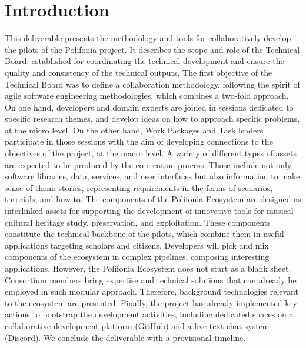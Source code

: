 \chapter{Introduction}
This deliverable presents the methodology and tools for collaboratively develop the pilots of the Polifonia project. It describes the scope and role of the Technical Board, established for coordinating the technical development and ensure the quality and consistency of the technical outputs. The first objective of the Technical Board was to define a collaboration methodology, following the spirit of agile software engineering methodologies, which combines a two-fold approach. On one hand, developers and domain experts are joined in sessions dedicated to specific research themes, and develop ideas on how to approach specific problems, at the micro level. On the other hand, Work Packages and Task leaders participate in those sessions with the aim of developing connections to the objectives of the project, at the macro level. A variety of different types of assets are expected to be produced by the co-creation process. Those include not only software libraries, data, services, and user interfaces but also information to make sense of them: stories, representing requirements in the forms of scenarios, tutorials, and how-to. The components of the Polifonia Ecosystem are designed as interlinked assets for supporting the development of innovative tools for musical cultural heritage study, preservation, and exploitation. These components constitute the technical backbone of the pilots, which combine them in useful applications targeting scholars and citizens. Developers will pick and mix components of the ecosystem in complex pipelines, composing interesting applications. However, the Polifonia Ecosystem does not start as a blank sheet. Consortium members bring expertise and technical solutions that can already be employed in such modular approach. Therefore, background technologies relevant to the ecosystem are presented. Finally, the project has already implemented key actions to bootstrap the development activities, including dedicated spaces on a collaborative development platform (GitHub) and a live text chat system (Discord). We conclude the deliverable with a provisional timeline. 